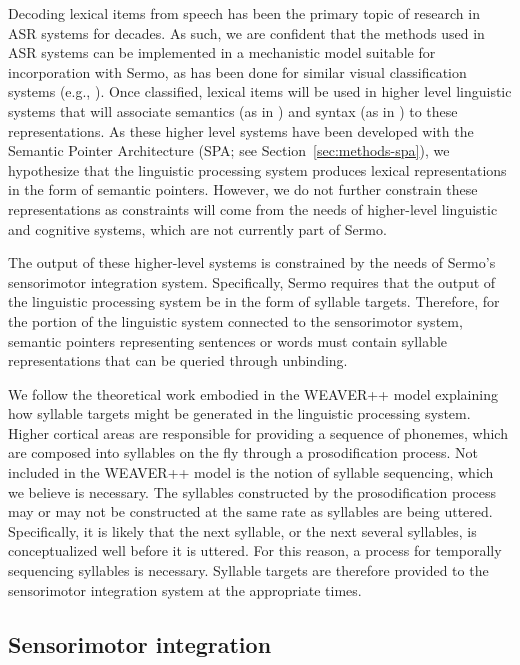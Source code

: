 Decoding lexical items from speech
has been the primary topic of research
in ASR systems for decades.
As such, we are confident that
the methods used in ASR systems
can be implemented in a mechanistic model
suitable for incorporation with Sermo,
as has been done for similar
visual classification systems
(e.g., \citealt{hunsberger2013,hunsberger2015}).
Once classified, lexical items
will be used in higher level linguistic
systems that will associate
semantics (as in \citealt{blouw2013,blouw2015})
and syntax (as in \citealt{stewart2014,stewart2015})
to these representations.
As these higher level systems
have been developed with
the Semantic Pointer Architecture
(SPA; see Section~\ref{sec:methods-spa}),
we hypothesize that the linguistic processing system
produces lexical representations
in the form of semantic pointers.
However, we do not further constrain these representations
as constraints will come from the needs of
higher-level linguistic and cognitive systems,
which are not currently part of Sermo.

The output of these higher-level systems
is constrained by the needs
of Sermo's sensorimotor integration system.
Specifically, Sermo requires that
the output of the
linguistic processing system
be in the form of syllable targets.
Therefore, for the portion
of the linguistic system connected
to the sensorimotor system,
semantic pointers representing
sentences or words must contain
syllable representations that can be
queried through unbinding.

We follow the theoretical work
embodied in the WEAVER++ model
\citet{roelofs2000,roelofs2008,roelofs2014}
explaining how syllable targets might be generated
in the linguistic processing system.
Higher cortical areas are responsible
for providing a sequence of phonemes,
which are composed into syllables on the fly
through a prosodification process.
Not included in the WEAVER++ model
is the notion of syllable sequencing,
which we believe is necessary.
The syllables constructed by the
prosodification process
may or may not be constructed
at the same rate as syllables
are being uttered.
Specifically, it is likely that
the next syllable,
or the next several syllables,
is conceptualized well before it is uttered.
For this reason, a process for
temporally sequencing syllables
is necessary.
Syllable targets are therefore provided
to the sensorimotor integration system
at the appropriate times.

\subsection{Sensorimotor integration}
\label{sec:model-sm}

